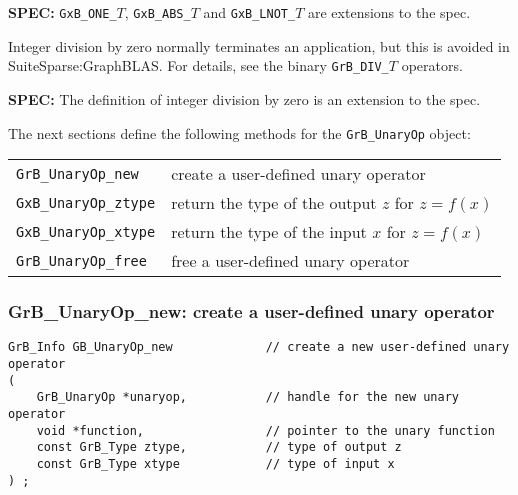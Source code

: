 \documentclass[12pt]{article}
\begin{document}
\begin{spec}
{\bf SPEC:} \verb'GxB_ONE_'$T$, \verb'GxB_ABS_'$T$ and \verb'GxB_LNOT_'$T$ are extensions to the spec.
\end{spec}

Integer division by zero normally terminates an application, but this is
avoided in SuiteSparse:GraphBLAS.  For details, see the binary
\verb'GrB_DIV_'$T$ operators.

\begin{spec}
{\bf SPEC:} The definition of integer division by zero is an extension to the spec.
\end{spec}

The next sections define the following methods for the \verb'GrB_UnaryOp'
object:

\vspace{0.1in}
{\footnotesize
\begin{tabular}{ll}
\hline
\verb'GrB_UnaryOp_new'   & create a user-defined unary operator  \\
\verb'GxB_UnaryOp_ztype' & return the type of the output $z$ for $z=f(x)$\\
\verb'GxB_UnaryOp_xtype' & return the type of the input $x$ for $z=f(x)$\\
\verb'GrB_UnaryOp_free'  & free a user-defined unary operator  \\
\hline
\end{tabular}
}
\vspace{0.1in}

\subsubsection{{\sf GrB\_UnaryOp\_new:} create a user-defined unary operator}
\label{unaryop_new}

\begin{mdframed}[userdefinedwidth=6in]
{\footnotesize
\begin{verbatim}
GrB_Info GB_UnaryOp_new             // create a new user-defined unary operator
(
    GrB_UnaryOp *unaryop,           // handle for the new unary operator
    void *function,                 // pointer to the unary function
    const GrB_Type ztype,           // type of output z
    const GrB_Type xtype            // type of input x
) ;
\end{verbatim} }\end{mdframed}
\end{document}
